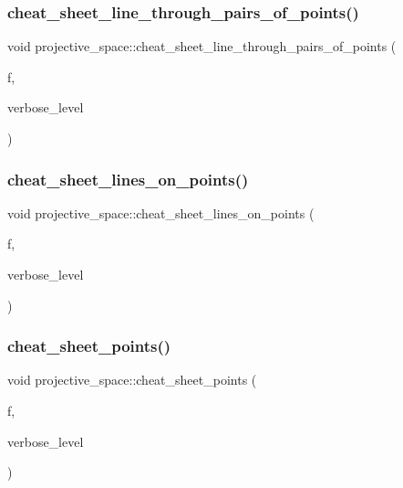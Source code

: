 \subsubsection{\texorpdfstring{cheat\+\_\+sheet\+\_\+line\+\_\+through\+\_\+pairs\+\_\+of\+\_\+points()}{cheat\_sheet\_line\_through\_pairs\_of\_points()}}
{\footnotesize\ttfamily void projective\+\_\+space\+::cheat\+\_\+sheet\+\_\+line\+\_\+through\+\_\+pairs\+\_\+of\+\_\+points (\begin{DoxyParamCaption}\item[{ostream \&}]{f,  }\item[{\mbox{\hyperlink{galois_8h_a09fddde158a3a20bd2dcadb609de11dc}{I\+NT}}}]{verbose\+\_\+level }\end{DoxyParamCaption})}

\mbox{\label{classprojective__space_affbae8779512f163e27a817ad7f7d973}} 
\subsubsection{\texorpdfstring{cheat\+\_\+sheet\+\_\+lines\+\_\+on\+\_\+points()}{cheat\_sheet\_lines\_on\_points()}}
{\footnotesize\ttfamily void projective\+\_\+space\+::cheat\+\_\+sheet\+\_\+lines\+\_\+on\+\_\+points (\begin{DoxyParamCaption}\item[{ostream \&}]{f,  }\item[{\mbox{\hyperlink{galois_8h_a09fddde158a3a20bd2dcadb609de11dc}{I\+NT}}}]{verbose\+\_\+level }\end{DoxyParamCaption})}

\mbox{\label{classprojective__space_afad07ce0528c10014933e72daf13a9fc}} 
\subsubsection{\texorpdfstring{cheat\+\_\+sheet\+\_\+points()}{cheat\_sheet\_points()}}
{\footnotesize\ttfamily void projective\+\_\+space\+::cheat\+\_\+sheet\+\_\+points (\begin{DoxyParamCaption}\item[{ostream \&}]{f,  }\item[{\mbox{\hyperlink{galois_8h_a09fddde158a3a20bd2dcadb609de11dc}{I\+NT}}}]{verbose\+\_\+level }\end{DoxyParamCaption})}

